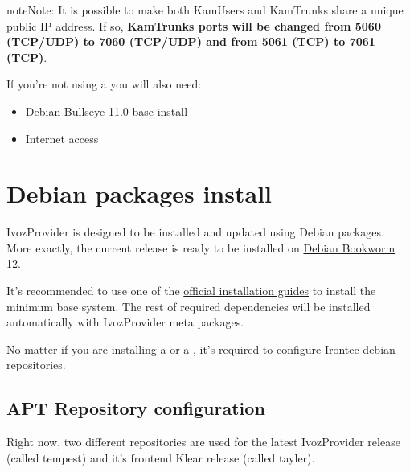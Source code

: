 \documentclass[letterpaper,10pt,english]{sphinxmanual}
\begin{document}
\begin{notice}{note}{Note:}
It is possible to make both KamUsers and KamTrunks
share a unique public IP address. If so, \textbf{KamTrunks ports will be changed
from 5060 (TCP/UDP) to 7060 (TCP/UDP) and from 5061 (TCP) to 7061 (TCP)}.
\end{notice}

If you're not using a {\hyperref[basic_concepts/installation/cd_install:automatic\string-iso\string-cd\string-image]{}} you will also need:
\begin{itemize}
\item {} 
Debian Bullseye 11.0 base install

\item {} 
Internet access

\end{itemize}


\section{Debian packages install}
\label{basic_concepts/installation/debian_install::doc}\label{basic_concepts/installation/debian_install:debian-packages-install}
IvozProvider is designed to be installed and updated using Debian packages.
More exactly, the current release is ready to be installed on
\href{https://www.debian.org/releases/bookworm}{Debian Bookworm 12}.

It's recommended to use one of the \href{https://www.debian.org/releases/bookworm/installmanual}{official installation guides} to install the minimum
base system. The rest of required  dependencies will be installed automatically
with IvozProvider meta packages.

No matter if you are installing a {\hyperref[basic_concepts/installation/install_types:standalone\string-install]{}} or a
{\hyperref[basic_concepts/installation/install_types:distributed\string-install]{}}, it's required to configure Irontec debian
repositories.


\subsection{APT Repository configuration}
\label{basic_concepts/installation/debian_install:apt-repository-configuration}
Right now, two different repositories are used for the latest IvozProvider
release (called tempest) and it's frontend Klear release (called tayler).
\end{document}
